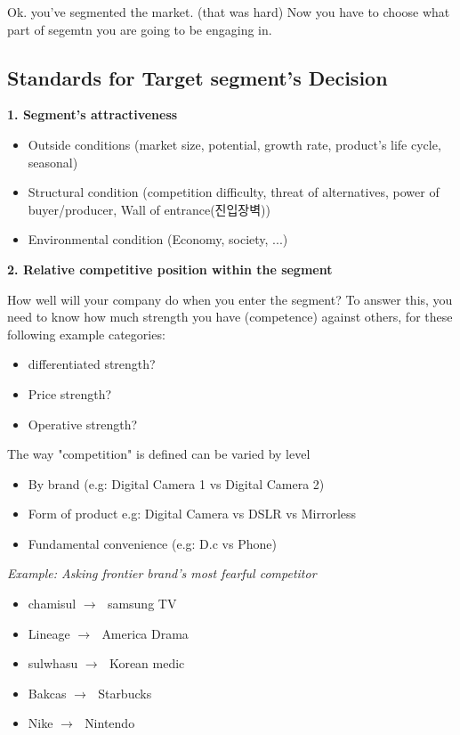 \documentclass[12pt]{article}
\newcommand{\ra}{$\rightarrow \text{ }$}
\newcommand{\tb}{\textbf}
\newcommand{\sk}{\smallskip}
\begin{document}
Ok. you've segmented the market. (that was hard) Now you have to choose what part of segemtn you are going to be engaging in.

\subsection{Standards for Target segment's Decision}

\tb{1. Segment's attractiveness}
\begin{itemize}
	\item Outside conditions (market size, potential, growth rate, product's life cycle, seasonal)
	\item Structural condition (competition difficulty, threat of alternatives, power of buyer/producer, Wall of entrance(진입장벽))
	\item Environmental condition (Economy, society, ...)
\end{itemize}

\sk

\tb{2. Relative competitive position within the segment}

How well will your company do when you enter the segment? To answer this, you need to know how much strength you have (competence) against others, for these following example categories:
\begin{itemize}
	\item differentiated strength?
	\item Price strength?
	\item Operative strength?
\end{itemize}

{\large The way "competition" is defined can be varied by level}


\begin{itemize}
	\item By brand (e.g: Digital Camera 1 vs Digital Camera 2)
	\item Form of product {e.g: Digital Camera vs DSLR vs Mirrorless}
	\item Fundamental convenience (e.g: D.c vs Phone)
\end{itemize}

\textit{Example: Asking frontier brand's most fearful competitor}

\begin{tcolorbox}
	\begin{itemize}
		\item chamisul \ra samsung TV
		\item Lineage \ra America Drama
		\item sulwhasu \ra Korean medic
		\item Bakcas \ra Starbucks
		\item Nike \ra Nintendo
	\end{itemize}
\end{tcolorbox}
\end{document}
